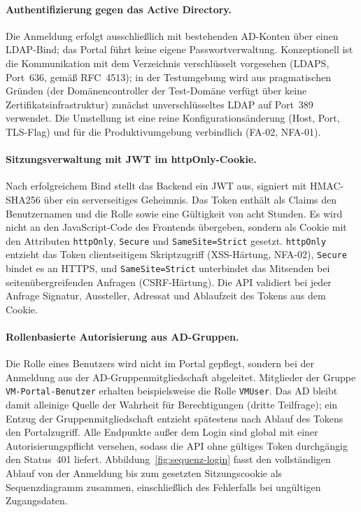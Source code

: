 \documentclass[12pt,a4paper]{article}
\begin{document}
\paragraph{Authentifizierung gegen das Active Directory.} Die Anmeldung erfolgt ausschließlich mit bestehenden AD-Konten über einen LDAP-Bind; das Portal führt keine eigene Passwortverwaltung. Konzeptionell ist die Kommunikation mit dem Verzeichnis verschlüsselt vorgesehen (LDAPS, Port~636, gemäß RFC~4513); in der Testumgebung wird aus pragmatischen Gründen (der Domänencontroller der Test-Domäne verfügt über keine Zertifikatsinfrastruktur) zunächst unverschlüsseltes LDAP auf Port~389 verwendet. Die Umstellung ist eine reine Konfigurationsänderung (Host, Port, TLS-Flag) und für die Produktivumgebung verbindlich (FA-02, NFA-01).

\paragraph{Sitzungsverwaltung mit JWT im httpOnly-Cookie.} Nach erfolgreichem Bind stellt das Backend ein JWT aus, signiert mit HMAC-SHA256 über ein serverseitiges Geheimnis. Das Token enthält als Claims den Benutzernamen und die Rolle sowie eine Gültigkeit von acht Stunden. Es wird nicht an den JavaScript-Code des Frontends übergeben, sondern als Cookie mit den Attributen \texttt{httpOnly}, \texttt{Secure} und \texttt{SameSite=Strict} gesetzt. \texttt{httpOnly} entzieht das Token clientseitigem Skriptzugriff (XSS-Härtung, NFA-02), \texttt{Secure} bindet es an HTTPS, und \texttt{SameSite=Strict} unterbindet das Mitsenden bei seitenübergreifenden Anfragen (CSRF-Härtung). Die API validiert bei jeder Anfrage Signatur, Aussteller, Adressat und Ablaufzeit des Tokens aus dem Cookie.

\paragraph{Rollenbasierte Autorisierung aus AD-Gruppen.} Die Rolle eines Benutzers wird nicht im Portal gepflegt, sondern bei der Anmeldung aus der AD-Gruppenmitgliedschaft abgeleitet. Mitglieder der Gruppe \texttt{VM-Portal-Benutzer} erhalten beispielsweise die Rolle \texttt{VMUser}. Das AD bleibt damit alleinige Quelle der Wahrheit für Berechtigungen (dritte Teilfrage); ein Entzug der Gruppenmitgliedschaft entzieht spätestens nach Ablauf des Tokens den Portalzugriff. Alle Endpunkte außer dem Login sind global mit einer Autorisierungspflicht versehen, sodass die API ohne gültiges Token durchgängig den Status~401 liefert. Abbildung~\ref{fig:sequenz-login} fasst den vollständigen Ablauf von der Anmeldung bis zum gesetzten Sitzungscookie als Sequenzdiagramm zusammen, einschließlich des Fehlerfalls bei ungültigen Zugangsdaten.
\end{document}
